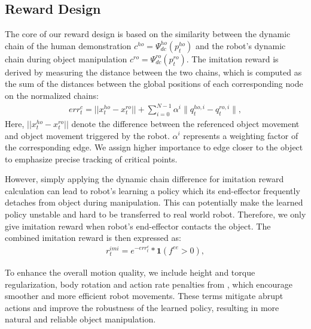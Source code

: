\subsection{Reward Design}

The core of our reward design is based on the similarity between the dynamic chain of the human demonstration $c^{ho}=\Psi^{ho}_{dc}(p^{ho}_t)$ and the robot's dynamic chain during object manipulation $c^{ro}=\Psi^{ro}_{dc}(p^{ro}_t)$. The imitation reward is derived by measuring the distance between the two chains, which is computed as the sum of the distances between the global positions of each corresponding node on the normalized chains:
\begin{align}
\label{eqn:norm_error}
   err^c_t = ||x^{ho}_t - x^{ro}_t|| + \sum_{i=0}^{N-1} \alpha^i \| q^{ho,i}_t - q^{ro,i}_t \|, 
\end{align}
Here, $||x^{ho}_t - x^{ro}_t||$ denote the difference between the referenced object movement and object movement triggered by the robot. $\alpha^i$ represents a weighting factor of the corresponding edge. We assign higher importance to edge closer to the object to emphasize precise tracking of critical points. 

However, simply applying the dynamic chain difference for imitation reward calculation can lead to robot's learning a policy which its end-effector frequently detaches from object during manipulation. This can potentially make the learned policy unstable and hard to be transferred to real world robot. Therefore, we only give imitation reward when robot's end-effector contacts the object. The combined imitation reward is then expressed as:
\begin{align}
\label{eqn:imi_2}
   r^{imi}_t = e^{-err^c_t }* \mathbf{1}(f^{ee}>0),
\end{align}


To enhance the overall motion quality, we include height and torque regularization, body rotation and action rate penalties from \citet{rudin2022learning}, which encourage smoother and more efficient robot movements. These terms mitigate abrupt actions and improve the robustness of the learned policy, resulting in more natural and reliable object manipulation.






